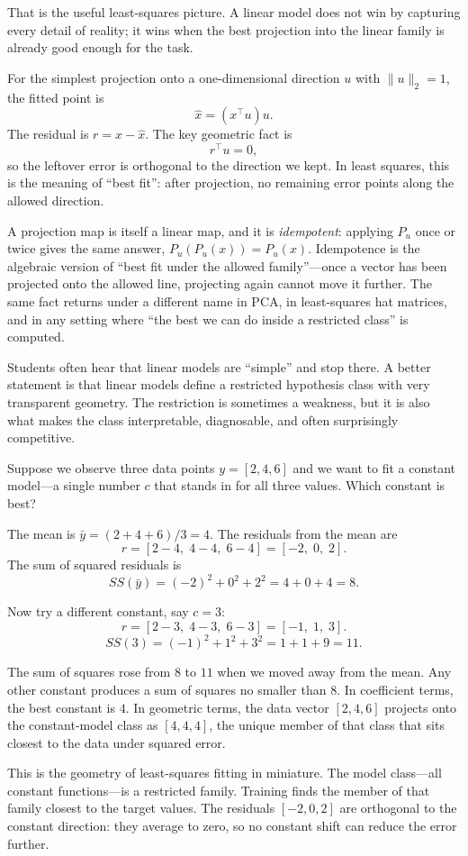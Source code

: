 That is the useful least-squares picture. A linear model does not win by capturing every detail of reality; it wins when the best projection into the linear family is already good enough for the task.

For the simplest projection onto a one-dimensional direction \(u\) with \(\|u\|_2=1\), the fitted point is
\[
\hat{x}=(x^\top u)u.
\]
The residual is \(r=x-\hat{x}\). The key geometric fact is
\[
r^\top u=0,
\]
so the leftover error is orthogonal to the direction we kept. In least squares, this is the meaning of ``best fit'': after projection, no remaining error points along the allowed direction.

A projection map is itself a linear map, and it is \emph{idempotent}: applying \(P_u\) once or twice gives the same answer, $P_u(P_u(x)) = P_u(x)$. Idempotence is the algebraic version of ``best fit under the allowed family''---once a vector has been projected onto the allowed line, projecting again cannot move it further. The same fact returns under a different name in PCA, in least-squares hat matrices, and in any setting where ``the best we can do inside a restricted class'' is computed.

Students often hear that linear models are ``simple'' and stop there. A better statement is that linear models define a restricted hypothesis class with very transparent geometry. The restriction is sometimes a weakness, but it is also what makes the class interpretable, diagnosable, and often surprisingly competitive.

\begin{example}
Suppose we observe three data points \(y = [2, 4, 6]\) and we want to fit a constant model---a single number \(c\) that stands in for all three values. Which constant is best?

The mean is \(\bar{y} = (2 + 4 + 6)/3 = 4\). The residuals from the mean are
\[
r = [2 - 4,\; 4 - 4,\; 6 - 4] = [-2,\; 0,\; 2].
\]
The sum of squared residuals is
\[
SS(\bar{y}) = (-2)^2 + 0^2 + 2^2 = 4 + 0 + 4 = 8.
\]

Now try a different constant, say \(c = 3\):
\[
r = [2-3,\; 4-3,\; 6-3] = [-1,\; 1,\; 3].
\]
\[
SS(3) = (-1)^2 + 1^2 + 3^2 = 1 + 1 + 9 = 11.
\]

The sum of squares rose from \(8\) to \(11\) when we moved away from the mean. Any other constant produces a sum of squares no smaller than \(8\). In coefficient terms, the best constant is \(4\). In geometric terms, the data vector \([2,4,6]\) projects onto the constant-model class as \([4,4,4]\), the unique member of that class that sits closest to the data under squared error.

This is the geometry of least-squares fitting in miniature. The model class---all constant functions---is a restricted family. Training finds the member of that family closest to the target values. The residuals \([-2, 0, 2]\) are orthogonal to the constant direction: they average to zero, so no constant shift can reduce the error further.
\end{example}

